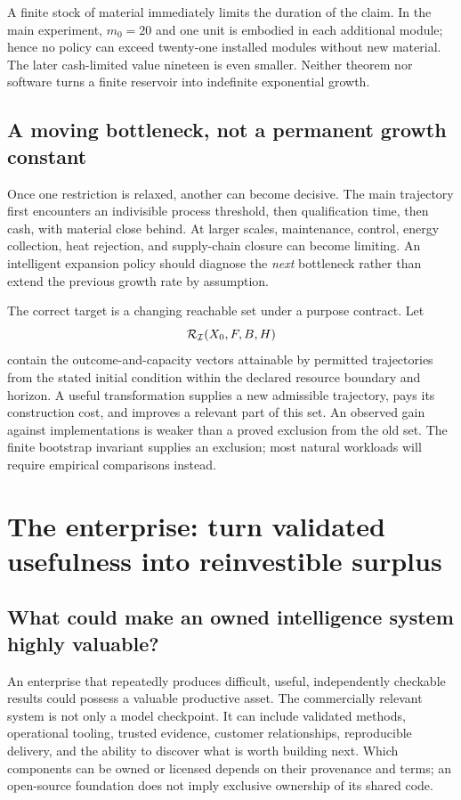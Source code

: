 \documentclass[11pt,letterpaper]{article}
\newcommand{\I}{\mathcal I}\newcommand{\A}{\mathcal A}
\newcommand{\1}{\mathbf 1}
\theoremstyle{remark}\newtheorem{remark}{Remark}[section]
\begin{document}
A finite stock of material immediately limits the duration of the claim. In the main experiment, $m_0=20$ and one unit is embodied in each additional module; hence no policy can exceed twenty-one installed modules without new material. The later cash-limited value nineteen is even smaller. Neither theorem nor software turns a finite reservoir into indefinite exponential growth.

\subsection{A moving bottleneck, not a permanent growth constant}
Once one restriction is relaxed, another can become decisive. The main trajectory first encounters an indivisible process threshold, then qualification time, then cash, with material close behind. At larger scales, maintenance, control, energy collection, heat rejection, and supply-chain closure can become limiting. An intelligent expansion policy should diagnose the \emph{next} bottleneck rather than extend the previous growth rate by assumption.

The correct target is a changing reachable set under a purpose contract. Let
\begin{equation}
 \Rset_{\I}(X_0,F,B,H)
\end{equation}
contain the outcome-and-capacity vectors attainable by permitted trajectories from the stated initial condition within the declared resource boundary and horizon. A useful transformation supplies a new admissible trajectory, pays its construction cost, and improves a relevant part of this set. An observed gain against implementations is weaker than a proved exclusion from the old set. The finite bootstrap invariant supplies an exclusion; most natural workloads will require empirical comparisons instead.

\section{The enterprise: turn validated usefulness into reinvestible surplus}\label{sec:enterprise}
\subsection{What could make an owned intelligence system highly valuable?}
An enterprise that repeatedly produces difficult, useful, independently checkable results could possess a valuable productive asset. The commercially relevant system is not only a model checkpoint. It can include validated methods, operational tooling, trusted evidence, customer relationships, reproducible delivery, and the ability to discover what is worth building next. Which components can be owned or licensed depends on their provenance and terms; an open-source foundation does not imply exclusive ownership of its shared code.
\end{document}
